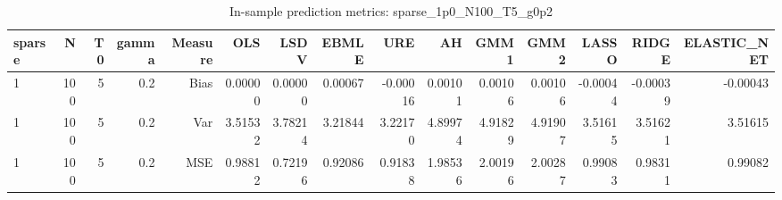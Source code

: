\begin{table}[!htbp]\centering
\caption{In-sample prediction metrics: sparse_1p0_N100_T5_g0p2}
\label{tab:table2_sparse_1p0_N100_T5_g0p2}
\begin{tabular}{lrrrrrrrrrrrrrr}
\hline
sparse & N & T0 & gamma & Measure & OLS & LSDV & EBMLE & URE & AH & GMM1 & GMM2 & LASSO & RIDGE & ELASTIC_NET \\
\hline
1 & 100 & 5 & 0.2 & Bias & 0.00000 & 0.00000 & 0.00067 & -0.00016 & 0.00101 & 0.00106 & 0.00106 & -0.00044 & -0.00039 & -0.00043 \\
1 & 100 & 5 & 0.2 & Var & 3.51532 & 3.78214 & 3.21844 & 3.22170 & 4.89974 & 4.91829 & 4.91907 & 3.51615 & 3.51621 & 3.51615 \\
1 & 100 & 5 & 0.2 & MSE & 0.98812 & 0.72196 & 0.92086 & 0.91838 & 1.98536 & 2.00196 & 2.00287 & 0.99083 & 0.98311 & 0.99082 \\
\hline
\end{tabular}
\end{table}


